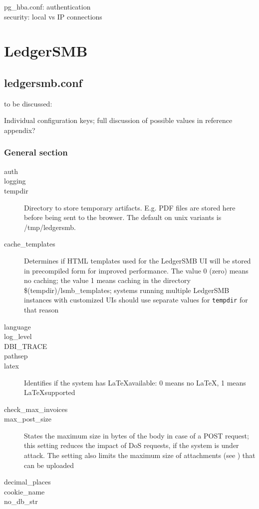 pg\_hba.conf: authentication \\
security: local vs IP connections \\




\section{LedgerSMB}

\subsection{ledgersmb.conf}

to be discussed:

Individual configuration keys; full discussion of possible values in reference appendix?

\subsubsection{General section}

\begin{description}
\item[auth]
\item[logging]
\item[tempdir] Directory to store temporary artifacts. E.g. PDF files are stored here before
    being sent to the browser. The default on unix variants is /tmp/ledgersmb.
\item[cache\_templates] Determines if HTML templates used for the LedgerSMB UI will be stored
    in precompiled form for improved performance. The value 0 (zero) means no caching; the value
    1 means caching in the directory \$(tempdir)/lsmb\_templates; systems running multiple
    LedgerSMB instances with customized UIs should use separate values for {\tt tempdir} for that
    reason
\item[language]
\item[log\_level]
\item[DBI\_TRACE]
\item[pathsep]
\item[latex] Identifies if the system has \LaTeX available: 0 means no \LaTeX, 1 means \LaTeX supported
\item[check\_max\_invoices]
\item[max\_post\_size] States the maximum size in bytes of the body in case of a POST request; this
    setting reduces the impact of DoS requests, if the system is under attack. The setting also limits the
    maximum size of attachments (see ) that can be uploaded
\item[decimal\_places]
\item[cookie\_name]
\item[no\_db\_str]

\end{description}

